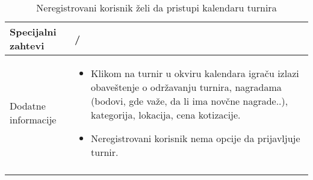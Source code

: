 \documentclass{article}
\begin{document}
\begin{longtable}{| p{} | p{} |}
        \hline
            Specijalni zahtevi & /\\
        \hline
            Dodatne informacije & 
                \begin{itemize}
                    \item Klikom na turnir u okviru kalendara igraču izlazi obaveštenje o održavanju turnira, nagradama (bodovi, gde važe, da li ima novčne nagrade..), kategorija, lokacija, cena kotizacije. 
                    \item Neregistrovani korisnik nema opcije da prijavljuje turnir.
                \end{itemize} \\
        \hline
        \caption{Neregistrovani korisnik želi da pristupi kalendaru turnira} 
    \end{longtable}
\end{document}

